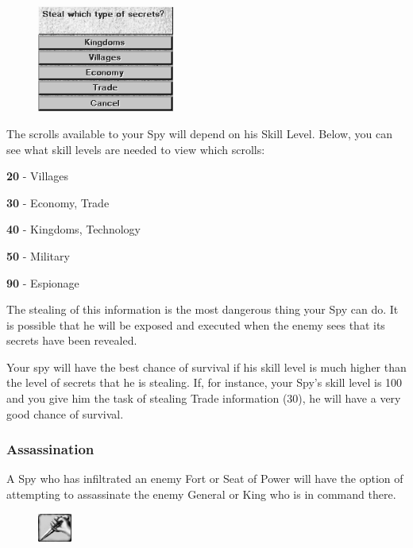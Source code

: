 \begin{figure}
	\vspace{-20pt}
	\begin{center}
		\includegraphics[width=0.4\textwidth]{Isecrets}
	\end{center}
	\vspace{-20pt}
\end{figure}

The scrolls available to your Spy will depend on his Skill Level. Below, you can see what skill levels are needed to view which scrolls:

\begin{adjustwidth}{1cm}{}
\textbf{20} - Villages

\textbf{30} - Economy, Trade

\textbf{40} - Kingdoms, Technology

\textbf{50} - Military

\textbf{90} - Espionage \\
\end{adjustwidth}

The stealing of this information is the most dangerous thing your Spy can do. It is possible that he will be exposed and executed when the enemy sees that its secrets have been revealed.

Your spy will have the best chance of survival if his skill level is much higher than the level of secrets that he is stealing. If, for instance, your Spy’s skill level is 100 and you give him the task of stealing Trade information (30), he will have a very good chance of survival.

\subsubsection{Assassination}

 A Spy who has infiltrated an enemy Fort or Seat of Power will have the option of attempting to assassinate the enemy General or King who is in command there.

\begin{figure}
	\vspace{-20pt}
	\begin{center}
		\includegraphics[width=0.1\textwidth]{Tassinate}
	\end{center}
	\vspace{-20pt}
\end{figure}

